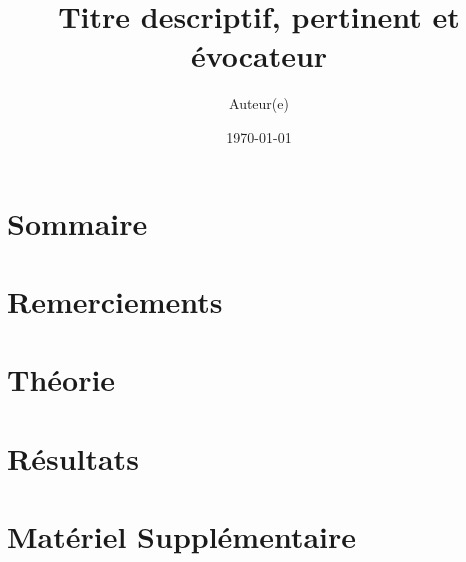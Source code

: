 \documentclass[titlepage,openright,letterpaper,12pt]{book}
\title          {Titre descriptif, pertinent et évocateur} %
\author         {Auteur(e)}  %
\date           {\today}       %
\begin{document}


\frontmatter %




\thispagestyle{empty}

\clearpage  %
\chapter*{Sommaire}


\chapter*{Remerciements}


{
    \setlength{\parskip}{0ex}
    \tableofcontents
    \listoffigures
}


\mainmatter %
\onehalfspacing
\autoPageBlancheLivre


\Introduction   %


\chapter{Théorie}



\chapter{Résultats}


\Conclusion %



\singlespacing
\autoPageBlancheLivre

\appendix
\renewcommand\chapterstring{Annexe}
\chapter{Matériel Supplémentaire}



\end{document}
